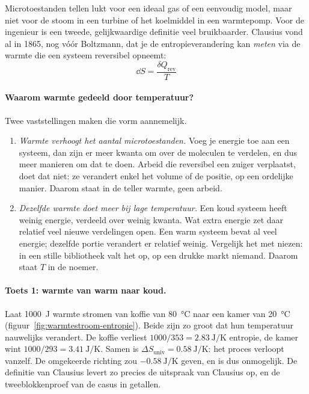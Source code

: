 Microtoestanden tellen lukt voor een ideaal gas of een eenvoudig model, maar niet voor de stoom in een turbine of het koelmiddel in een warmtepomp. Voor de ingenieur is een tweede, gelijkwaardige definitie veel bruikbaarder. Clausius vond al in 1865, nog v\'o\'or Boltzmann, dat je de entropieverandering kan \emph{meten} via de warmte die een systeem reversibel opneemt:
\begin{equation}
\boxed{\dd S = \frac{\delta Q_{\text{rev}}}{T}}
\label{eq:clausius}
\end{equation}

\paragraph{Waarom warmte gedeeld door temperatuur?} Twee vaststellingen maken die vorm aannemelijk.
\begin{enumerate}
\item \emph{Warmte verhoogt het aantal microtoestanden.} Voeg je energie toe aan een systeem, dan zijn er meer kwanta om over de moleculen te verdelen, en dus meer manieren om dat te doen. Arbeid die reversibel een zuiger verplaatst, doet dat niet: ze verandert enkel het volume of de positie, op een ordelijke manier. Daarom staat in de teller warmte, geen arbeid.
\item \emph{Dezelfde warmte doet meer bij lage temperatuur.} Een koud systeem heeft weinig energie, verdeeld over weinig kwanta. Wat extra energie zet daar relatief veel nieuwe verdelingen open. Een warm systeem bevat al veel energie; dezelfde portie verandert er relatief weinig. Vergelijk het met niezen: in een stille bibliotheek valt het op, op een drukke markt niemand. Daarom staat $T$ in de noemer.
\end{enumerate}

\paragraph{Toets 1: warmte van warm naar koud.} Laat \SI{1000}{\joule} warmte stromen van koffie van \SI{80}{\celsius} naar een kamer van \SI{20}{\celsius} (figuur~\ref{fig:warmtestroom-entropie}). Beide zijn zo groot dat hun temperatuur nauwelijks verandert. De koffie verliest $1000/353 = \SI{2.83}{\joule\per\kelvin}$ entropie, de kamer wint $1000/293 = \SI{3.41}{\joule\per\kelvin}$. Samen is $\Delta S_\text{univ} = \SI{+0.58}{\joule\per\kelvin}$: het proces verloopt vanzelf. De omgekeerde richting zou $\SI{-0.58}{\joule\per\kelvin}$ geven, en is dus onmogelijk. De definitie van Clausius levert zo precies de uitspraak van Clausius op, en de tweeblokkenproef van de casus in getallen.

